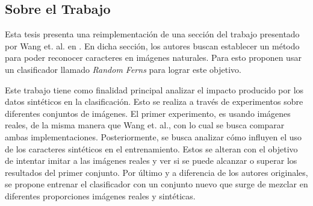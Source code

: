 \subsection{Sobre el Trabajo}

	Esta tesis presenta una reimplementación de una sección del trabajo presentado por Wang et. al. en \cite{wang}. En dicha sección, los autores buscan establecer un método para poder reconocer caracteres en imágenes naturales. Para esto proponen usar un clasificador llamado \textit{Random Ferns} para lograr este objetivo.
	
	Este trabajo tiene como finalidad principal analizar el impacto producido por los datos sintéticos en la clasificación. Esto se realiza a través de experimentos sobre diferentes conjuntos de imágenes. El primer experimento, es usando imágenes reales, de la misma manera que Wang et. al., con lo cual se busca comparar ambas implementaciones. Posteriormente, se busca analizar cómo influyen el uso de los caracteres sintéticos en el entrenamiento. Estos se alteran con el objetivo de intentar imitar a las imágenes reales y ver si se puede alcanzar o superar los resultados del primer conjunto. Por último y a diferencia de los autores originales, se propone entrenar el clasificador con  un conjunto nuevo que surge de mezclar en diferentes proporciones imágenes reales y sintéticas.